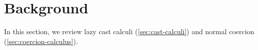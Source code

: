 \documentclass[acmsmall,review,anonymous]{acmart}\settopmatter{printfolios=true,printccs=false,printacmref=false}
\newcommand{\lazyUD}{$\mathtt{Lazy UD}$}
\newcommand{\lazyD}{$\mathtt{Lazy D}$}
\newcommand{\eager}{$\mathtt{Eager}$}
\begin{document}
%

\section{Background} \label{sec:background}

In this section, we review lazy cast calculi (\ref{sec:cast-calculi}) and
normal coercion (\ref{sec:coercion-calculus}). 
\end{document}
